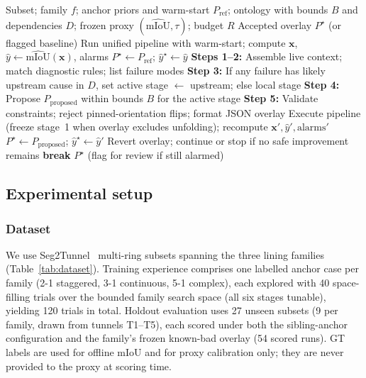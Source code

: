\documentclass[a4paper,fleqn]{cas-dc}
\begin{document}
\begin{algorithm}[ht]
\caption{Proxy-guided reflective parameter adaptation}\label{alg:reflective_adaptation}
\begin{algorithmic}[1]
\Require Subset; family $f$; anchor priors and warm-start $P_{\mathrm{ref}}$; ontology with bounds $B$ and dependencies $D$; frozen proxy $(\widehat{\text{mIoU}},\tau)$; budget $R$
\Ensure Accepted overlay $P^\star$ (or flagged baseline)
\State Run unified pipeline with warm-start; compute $\mathbf{x}$, $\hat{y}\gets\widehat{\text{mIoU}}(\mathbf{x})$, alarms
\State $P^\star\gets P_{\mathrm{ref}}$; $\hat{y}^\star\gets\hat{y}$
    \State \textbf{Steps 1--2:} Assemble live context; match diagnostic rules; list failure modes
    \State \textbf{Step 3:} If any failure has likely upstream cause in $D$, set active stage $\leftarrow$ upstream; else local stage
    \State \textbf{Step 4:} Propose $P_{\mathrm{proposed}}$ within bounds $B$ for the active stage
    \State \textbf{Step 5:} Validate constraints; reject pinned-orientation flips; format JSON overlay
    \State Execute pipeline (freeze stage~1 when overlay excludes unfolding); recompute $\mathbf{x}',\hat{y}',\mathrm{alarms}'$
        \State $P^\star\gets P_{\mathrm{proposed}}$; $\hat{y}^\star\gets\hat{y}'$
    \Else
        \State Revert overlay; continue or stop if no safe improvement remains
    \EndIf
        \State \textbf{break} 
    \EndIf
\EndFor
\State \Return $P^\star$ (flag for review if still alarmed)
\end{algorithmic}
\end{algorithm}

\subsection{Experimental setup}\label{sec:exp-setup}

\subsubsection{Dataset}\label{sec:dataset}

We use Seg2Tunnel~\cite{lin2024seg2tunnel} multi-ring subsets spanning the three lining families (Table~\ref{tab:dataset}). Training experience comprises one labelled anchor case per family (2-1 staggered, 3-1 continuous, 5-1 complex), each explored with 40 space-filling trials over the bounded family search space (all six stages tunable), yielding 120 trials in total. Holdout evaluation uses 27 unseen subsets (9 per family, drawn from tunnels T1--T5), each scored under both the sibling-anchor configuration and the family's frozen known-bad overlay (54 scored runs). GT labels are used for offline mIoU and for proxy calibration only; they are never provided to the proxy at scoring time.
\end{document}
